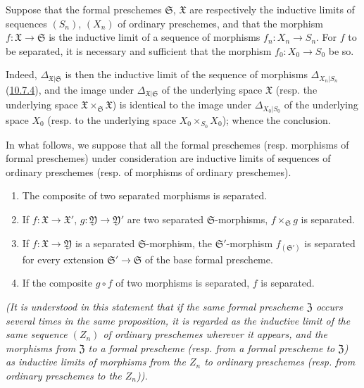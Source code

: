 \begin{proposition}[10.15.2]
\label{I.10.15.2}
Suppose that the formal preschemes $\mathfrak{S}$, $\mathfrak{X}$ are
respectively the inductive limits of sequences $(S_n)$, $(X_n)$ of
ordinary preschemes, and that the morphism
$f:\mathfrak{X}\to\mathfrak{S}$ is the inductive limit of a sequence of
morphisms $f_n:X_n\to S_n$. For $f$ to be separated, it is necessary and
sufficient that the morphism $f_0:X_0\to S_0$ be so.
\end{proposition}

Indeed, $\Delta_{\mathfrak{X}|\mathfrak{S}}$ is then the inductive limit of
the sequence of morphisms $\Delta_{X_n|S_n}$
(\hyperref[I.10.7.4]{10.7.4}), and the image under
$\Delta_{\mathfrak{X}|\mathfrak{S}}$ of the underlying space
$\mathfrak{X}$ (resp. the underlying space
$\mathfrak{X}\times_{\mathfrak{S}}\mathfrak{X}$) is identical to the image
under $\Delta_{X_0|S_0}$ of the underlying space $X_0$ (resp. to the
underlying space $X_0\times_{S_0}X_0$); whence the conclusion.

\begin{proposition}[10.15.3]
\label{I.10.15.3}
In what follows, we suppose that all the formal preschemes \textup{(resp.}
morphisms of formal preschemes) under consideration are inductive limits of
sequences of ordinary preschemes \textup{(resp.} of morphisms of ordinary preschemes).
\begin{enumerate}
  \item[\rm{(i)}] The composite of two separated morphisms is separated.
  \item[\rm{(ii)}] If $f:\mathfrak{X}\to\mathfrak{X}'$,
  $g:\mathfrak{Y}\to\mathfrak{Y}'$ are two separated
  $\mathfrak{S}$-morphisms, $f\times_{\mathfrak{S}}g$ is separated.
  \item[\rm{(iii)}] If $f:\mathfrak{X}\to\mathfrak{Y}$ is a separated
  $\mathfrak{S}$-morphism, the $\mathfrak{S}'$-morphism
  $f_{(\mathfrak{S}')}$ is separated for every extension
  $\mathfrak{S}'\to\mathfrak{S}$ of the base formal prescheme.
  \item[\rm{(iv)}] If the composite $g\circ f$ of two morphisms is separated,
  $f$ is separated.
\end{enumerate}
\emph{(It is understood in this statement that if the same formal prescheme
$\mathfrak{Z}$ occurs several times in the same proposition, it is
regarded as the inductive limit of the \emph{same} sequence $(Z_n)$ of
ordinary preschemes wherever it appears, and the morphisms from
$\mathfrak{Z}$ to a formal prescheme (resp. from a formal prescheme to
$\mathfrak{Z}$) as inductive limits of morphisms from the $Z_n$ to ordinary
preschemes (resp. from ordinary preschemes to the $Z_n$)).}
\end{proposition}

